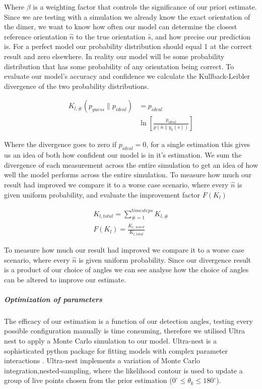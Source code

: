 \documentclass[final,3p, twocolumn]{elsarticle}
\begin{document}
Where $\beta$ is a weighting factor that controls the significance of our priori estimate. Since we are testing with a simulation we already know the exact orientation of the dimer, we want to know how often our model can determine the closest reference orientation $\hat{n}$ to the true orientation $\hat{s}$, and how precise our prediction is. For a perfect model our probability distribution should equal 1 at the correct result and zero elsewhere. In reality our model will be some probability distribution that has some probability of any orientation being correct. To evaluate our model's accuracy and confidence we calculate the Kullback-Leibler divergence of the two probability distributions. 

\begin{align}
	K_{l, \#}(p_{guess} \parallel p_{ideal}) &= 
	p_{ideal} \nonumber \\ 
	&\ln \left[\frac{p_{ideal}}{p(\hat{n}\parallel y_k(\hat{s}))}
	\right]
\end{align}

Where the divergence goes to zero if $p_{ideal}=0$, for a single estimation this gives us an idea of both how confident our model is in it's estimation. We sum the divergence of each measurement across the entire simulation to get an idea of how well the model performs across the entire simulation. To measure how much our result had improved we compare it to a worse case scenario, where every $\hat{n}$ is given uniform probability, and evaluate the improvement factor $F(K_l)$

\begin{align}
	K_{l,total} = \sum\limits_{\# =1}^{timesteps} K_{l,\#} \\
	F(K_l) = \frac{K_{l,\ worst}}{K_{l,total}}
\end{align}

To measure how much our result had improved we compare it to a worse case scenario, where every $\hat{n}$ is given uniform probability. Since our divergence result is a product of our choice of angles we can see analyse how the choice of angles can be altered to improve our estimate.  

\subparagraph{Optimization of parameters}
\label{2.2}
The efficacy of our estimation is a function of our detection angles, testing every possible configuration manually is time consuming, therefore we utilised Ultra nest to apply a Monte Carlo simulation to our model. Ultra-nest is a sophisticated python package for fitting models with complex parameter interactions \cite{Buchner2016Ultranest}. Ultra-nest implements a variation of Monte Carlo integration,nested-sampling, where the likelihood contour is used to update a group of live points chosen from the prior estimation ($0^{\circ} \leq \theta_k \leq 180^{\circ}$).
\end{document}
